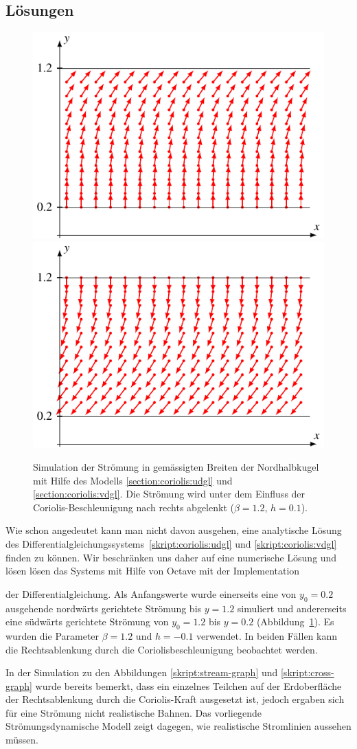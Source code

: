 \subsection{Lösungen}
\begin{figure}
\centering
\includegraphics[width=0.48\hsize]{chapters/2/upright.pdf}
\hspace{0.02\hsize}
\includegraphics[width=0.48\hsize]{chapters/2/downright.pdf}
\caption{Simulation der Strömung in gemässigten Breiten der Nordhalbkugel
mit Hilfe des Modells
\eqref{section:coriolis:udgl}
und
\eqref{section:coriolis:vdgl}.
Die Strömung wird unter dem Einfluss der Coriolis-Beschleunigung nach
rechts abgelenkt ($\beta=1.2$, $h=0.1$).
\label{section:coriolis:simbild}}
\end{figure}
Wie schon angedeutet kann man nicht davon ausgehen, eine analytische
Lösung des Differentialgleichungssystems~\eqref{skript:coriolis:udgl}
und \eqref{skript:coriolis:vdgl}
finden zu können.
Wir beschränken uns daher auf eine numerische Lösung und lösen
lösen das Systems mit Hilfe von Octave mit der Implementation

der Differentialgleichung.
Als Anfangswerte wurde einerseits eine von $y_0=0.2$ ausgehende nordwärts
gerichtete Strömung bis $y=1.2$ simuliert und andererseits eine südwärts
gerichtete Strömung von $y_0=1.2$ bis $y=0.2$
(Abbildung~\ref{section:coriolis:simbild}).
Es wurden die Parameter $\beta=1.2$ und $h=-0.1$ verwendet.
In beiden Fällen kann die Rechtsablenkung durch die Coriolisbeschleunigung
beobachtet werden.

In der Simulation zu den Abbildungen
\ref{skript:stream-graph}
und
\ref{skript:cross-graph}
wurde bereits bemerkt, dass ein einzelnes Teilchen auf der Erdoberfläche
der Rechtsablenkung durch die Coriolis-Kraft ausgesetzt ist,
jedoch ergaben sich für eine Strömung nicht realistische Bahnen.
Das vorliegende Strömungsdynamische Modell zeigt dagegen, wie
realistische Stromlinien aussehen müssen.

